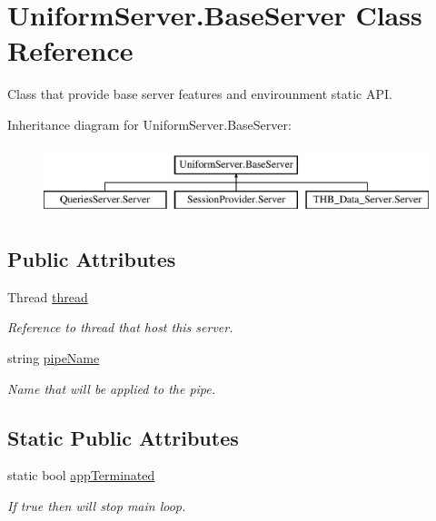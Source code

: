 \hypertarget{class_uniform_server_1_1_base_server}{}\section{Uniform\+Server.\+Base\+Server Class Reference}
\label{class_uniform_server_1_1_base_server}


Class that provide base server features and envirounment static A\+PI.  


Inheritance diagram for Uniform\+Server.\+Base\+Server\+:\begin{figure}[H]
\begin{center}
\leavevmode
\includegraphics[height=2.000000cm]{d7/d32/class_uniform_server_1_1_base_server}
\end{center}
\end{figure}
\subsection*{Public Attributes}
\begin{DoxyCompactItemize}
\item 
Thread \mbox{\hyperlink{class_uniform_server_1_1_base_server_a52485a2d70e615a5cbf720c952a8d62f}{thread}}
\begin{DoxyCompactList}\small\item\em Reference to thread that host this server. \end{DoxyCompactList}\item 
string \mbox{\hyperlink{class_uniform_server_1_1_base_server_aaa318b3ed503dd8ccf381c9f3a81ecf2}{pipe\+Name}}
\begin{DoxyCompactList}\small\item\em Name that will be applied to the pipe. \end{DoxyCompactList}\end{DoxyCompactItemize}
\subsection*{Static Public Attributes}
\begin{DoxyCompactItemize}
\item 
static bool \mbox{\hyperlink{class_uniform_server_1_1_base_server_a632ed557976f4d7bd9b41502bb9a262b}{app\+Terminated}}
\begin{DoxyCompactList}\small\item\em If true then will stop main loop. \end{DoxyCompactList}\end{DoxyCompactItemize}
